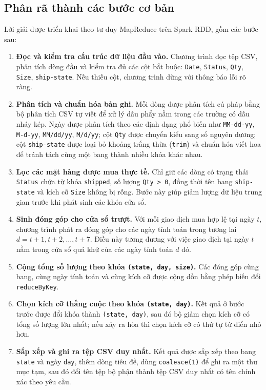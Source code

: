 \subsection{Phân rã thành các bước cơ bản}
Lời giải được triển khai theo tư duy MapReduce trên Spark RDD, gồm các bước sau:

\begin{enumerate}
    \item \textbf{Đọc và kiểm tra cấu trúc dữ liệu đầu vào.} Chương trình đọc tệp CSV, phân tích dòng đầu và kiểm tra đủ các cột bắt buộc: \texttt{Date}, \texttt{Status}, \texttt{Qty}, \texttt{Size}, \texttt{ship-state}. Nếu thiếu cột, chương trình dừng với thông báo lỗi rõ ràng.
    \item \textbf{Phân tích và chuẩn hóa bản ghi.} Mỗi dòng được phân tích cú pháp bằng bộ phân tích CSV tự viết để xử lý dấu phẩy nằm trong các trường có dấu nháy kép. Ngày được phân tích theo các định dạng phổ biến như \texttt{MM-dd-yy}, \texttt{M-d-yy}, \texttt{MM/dd/yy}, \texttt{M/d/yy}; cột \texttt{Qty} được chuyển kiểu sang số nguyên dương; cột \texttt{ship-state} được loại bỏ khoảng trắng thừa (\texttt{trim}) và chuẩn hóa viết hoa để tránh tách cùng một bang thành nhiều khóa khác nhau.
    \item \textbf{Lọc các mặt hàng được mua thực tế.} Chỉ giữ các dòng có trạng thái \texttt{Status} chứa từ khóa \texttt{shipped}, số lượng \texttt{Qty > 0}, đồng thời tên bang \texttt{ship-state} và kích cỡ \texttt{Size} không bị rỗng. Bước này giúp giảm lượng dữ liệu trung gian trước khi phát sinh các khóa cửa sổ.
    \item \textbf{Sinh đóng góp cho cửa sổ trượt.} Với mỗi giao dịch mua hợp lệ tại ngày $t$, chương trình phát ra đóng góp cho các ngày tính toán trong tương lai $d = t+1, t+2, \ldots, t+7$. Điều này tương đương với việc giao dịch tại ngày $t$ nằm trong cửa sổ quá khứ của các ngày tính toán $d$ đó.
    \item \textbf{Cộng tổng số lượng theo khóa \texttt{(state, day, size)}.} Các đóng góp cùng bang, cùng ngày tính toán và cùng kích cỡ được cộng dồn bằng phép biến đổi \texttt{reduceByKey}.
    \item \textbf{Chọn kích cỡ thắng cuộc theo khóa \texttt{(state, day)}.} Kết quả ở bước trước được đổi khóa thành \texttt{(state, day)}, sau đó bộ giảm chọn kích cỡ có tổng số lượng lớn nhất; nếu xảy ra hòa thì chọn kích cỡ có thứ tự từ điển nhỏ hơn.
    \item \textbf{Sắp xếp và ghi ra tệp CSV duy nhất.} Kết quả được sắp xếp theo bang \texttt{state} và ngày \texttt{day}, thêm dòng tiêu đề, dùng \texttt{coalesce(1)} để ghi ra một thư mục tạm, sau đó đổi tên tệp bộ phận thành tệp CSV duy nhất có tên chính xác theo yêu cầu.
\end{enumerate}

